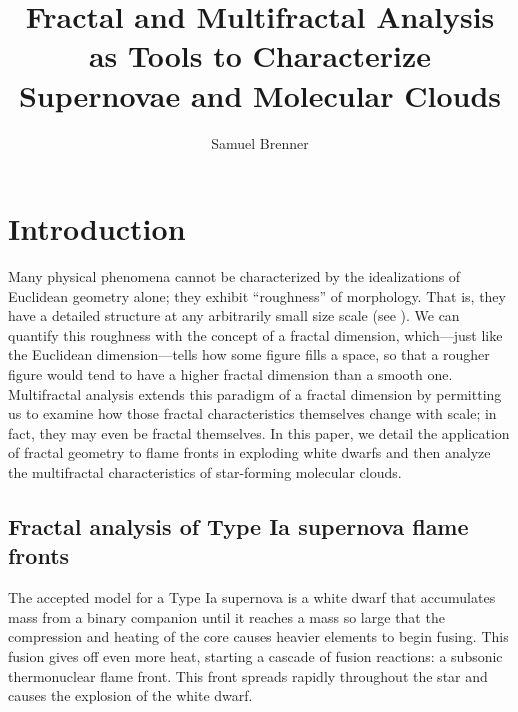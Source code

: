 \documentclass[iop]{emulateapj}
\begin{document}
%
\title{Fractal and Multifractal Analysis as Tools to Characterize Supernovae and Molecular Clouds}
%
\author{Samuel Brenner}
%
%
%
%
%
\begin{abstract}
\end{abstract}
%
%
%
%
%
%

\section{Introduction}
Many physical phenomena cannot be characterized by the idealizations of Euclidean geometry alone; they exhibit ``roughness'' of morphology. That is, they have a detailed structure at any arbitrarily small size scale (see \cite{Falconer2003}). We can quantify this roughness with the concept of a fractal dimension, which---just like the Euclidean dimension---tells how some figure fills a space, so that a rougher figure would tend to have a higher fractal dimension than a smooth one. Multifractal analysis extends this paradigm of a fractal dimension by permitting us to examine how those fractal characteristics themselves change with scale; in fact, they may even be fractal themselves. In this paper, we detail the application of fractal geometry to flame fronts in exploding white dwarfs and then analyze the multifractal characteristics of star-forming molecular clouds.

\subsection{Fractal analysis of Type Ia supernova flame fronts}
The accepted model for a Type Ia supernova is a white dwarf that accumulates mass from a binary companion until it reaches a mass so large that the compression and heating of the core causes heavier elements to begin fusing. This fusion gives off even more heat, starting a cascade of fusion reactions: a subsonic thermonuclear flame front. This front spreads rapidly throughout the star and causes the explosion of the white dwarf.
\end{document}
